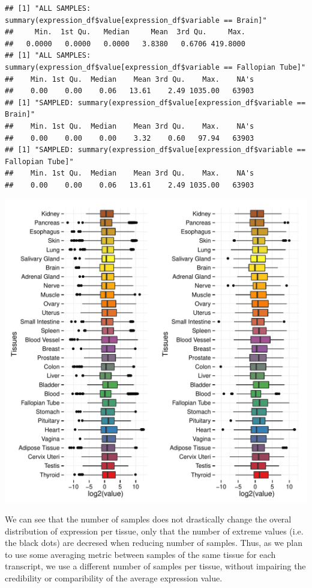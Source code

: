 \documentclass{article}\usepackage[]{graphicx}\usepackage[]{color}
\makeatletter
\def\maxwidth{ %
  \ifdim\Gin@nat@width>\linewidth
    \linewidth
  \else
    \Gin@nat@width
  \fi
}
\newenvironment{kframe}{%
 \def\at@end@of@kframe{}%
 \ifinner\ifhmode%
  \def\at@end@of@kframe{\end{minipage}}%
  \begin{minipage}{\columnwidth}%
 \fi\fi%
 \def\FrameCommand##1{\hskip\@totalleftmargin \hskip-\fboxsep
 \colorbox{shadecolor}{##1}\hskip-\fboxsep
     \hskip-\linewidth \hskip-\@totalleftmargin \hskip\columnwidth}%
 \MakeFramed {\advance\hsize-\width
   \@totalleftmargin\z@ \linewidth\hsize
   \@setminipage}}%
 {\par\unskip\endMakeFramed%
 \at@end@of@kframe}
\newenvironment{knitrout}{}{} %
\makeatother
\begin{document}
\begin{knitrout}
\color{fgcolor}\begin{kframe}
\begin{verbatim}
## [1] "ALL SAMPLES: summary(expression_df$value[expression_df$variable == Brain]"
##     Min.  1st Qu.   Median     Mean  3rd Qu.     Max. 
##   0.0000   0.0000   0.0000   3.8380   0.6706 419.8000 
## [1] "ALL SAMPLES: summary(expression_df$value[expression_df$variable == Fallopian Tube]"
##    Min. 1st Qu.  Median    Mean 3rd Qu.    Max.    NA's 
##    0.00    0.00    0.06   13.61    2.49 1035.00   63903 
## [1] "SAMPLED: summary(expression_df$value[expression_df$variable == Brain]"
##    Min. 1st Qu.  Median    Mean 3rd Qu.    Max.    NA's 
##    0.00    0.00    0.00    3.32    0.60   97.94   63903 
## [1] "SAMPLED: summary(expression_df$value[expression_df$variable == Fallopian Tube]"
##    Min. 1st Qu.  Median    Mean 3rd Qu.    Max.    NA's 
##    0.00    0.00    0.06   13.61    2.49 1035.00   63903
\end{verbatim}
\end{kframe}
\includegraphics[width=\maxwidth]{figure/expression_per_tissue-1} 

\end{knitrout}

We can see that the number of samples does not drastically change the overal distribution of expression per tissue, only that the number of extreme values (i.e. the black dots) are decresed when reducing number of samples. Thus, as we plan to use some averaging metric between samples of the same tissue for each transcript, we use a different number of samples per tissue, without impairing the credibility or comparibility of the average expression value.
\end{document}
